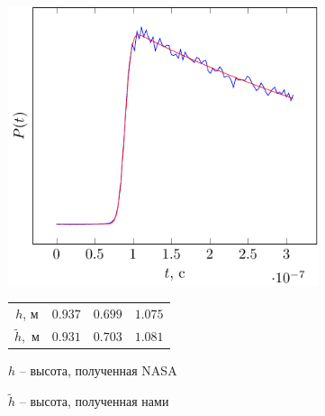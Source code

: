 \documentclass[10pt,pdf,hyperref={unicode}, dvipsnames]{beamer}
\begin{document}
\begin{frame}
\begin{figure}[ht]
\begin{subfigure}{0.42\linewidth}
    \end{subfigure}
    \hfill
    \begin{subfigure}{0.42\linewidth}
        \centering
        \includegraphics[width=\linewidth, page=3]{fig/retracking/real}
    \end{subfigure}
    \hfill
    \begin{subfigure}{0.42\linewidth}
        \centering
        \begin{tabular}{|c|c|c|c|}
            \hline
            $h$, м      & $0.937 $ & $0.699$ & $1.075$ \\
            $\tilde h,$ м & $0.931$ & $0.703$ & $1.081$ \\
            \hline
        \end{tabular}

        \vspace{\baselineskip}

        $h$ -- высота, полученная NASA

        $\tilde h$ -- высота, полученная нами

    \end{subfigure}

\end{figure}
\end{frame}
\end{document}

